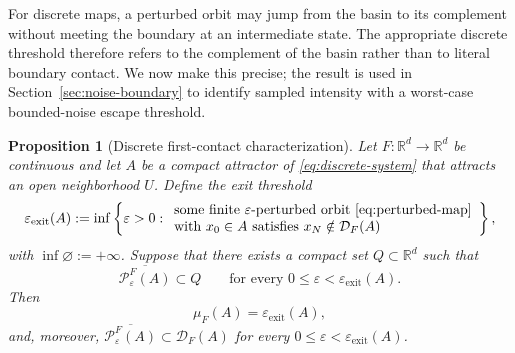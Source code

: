 \documentclass[pdflatex,sn-mathphys-num]{sn-jnl}
\numberwithin{equation}{section}
\theoremstyle{thmstyleone}%
\newtheorem{proposition}[theorem]{Proposition}
\theoremstyle{definition}
\theoremstyle{remark}
\begin{document}
For discrete maps, a perturbed orbit may jump from the basin to its complement without meeting the boundary at an intermediate state. The appropriate discrete threshold therefore refers to the complement of the basin rather than to literal boundary contact. We now make this precise; the result is used in Section~\ref{sec:noise-boundary} to identify sampled intensity with a worst-case bounded-noise escape threshold.

\begin{proposition}[Discrete first-contact characterization]
\label{prop:discrete-first-contact}
Let $F:\mathbb R^d\to\mathbb R^d$ be continuous and let $A$ be a compact attractor of \eqref{eq:discrete-system} that attracts an open neighborhood $U$. Define the exit threshold
\begin{equation}
\label{eq:discrete-exit-threshold}
    \varepsilon_{\mathrm{exit}}(A)
    :=
    \inf\left\{
    \varepsilon>0:
    \begin{array}{l}
    \text{some finite $\varepsilon$-perturbed orbit
    \eqref{eq:perturbed-map}}\\
    \text{with }x_0\in A
    \text{ satisfies }
    x_N\notin\mathcal D_F(A)
    \end{array}
    \right\},
\end{equation}
with $\inf\varnothing:=+\infty$. Suppose that there exists a compact set $Q\subset\mathbb R^d$ such that
\begin{equation}
\label{eq:discrete-no-escape-infinity}
    \overline{\mathcal P_\varepsilon^F(A)}\subset Q
    \qquad
    \text{for every }
    0\leq\varepsilon<\varepsilon_{\mathrm{exit}}(A).
\end{equation}
Then
\begin{equation}
\label{eq:discrete-first-contact-identity}
    \mu_F(A)=\varepsilon_{\mathrm{exit}}(A),
\end{equation}
and, moreover, $\overline{\mathcal P_\varepsilon^F(A)}\subset\mathcal D_F(A)$ for every $0\leq\varepsilon<\varepsilon_{\mathrm{exit}}(A)$.
\end{proposition}
\end{document}
